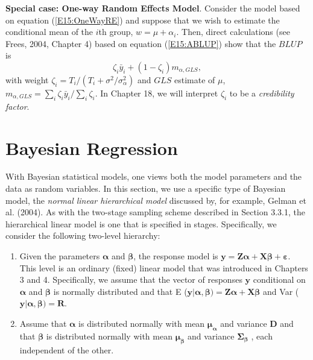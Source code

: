 \textbf{Special case: One-way Random Effects Model}. Consider the
model based on equation (\ref{E15:OneWayRE}) and suppose that we
wish to estimate the conditional mean of the $i$th group, $w=\mu +
\alpha_i.$ Then, direct calculations (see Frees, 2004, Chapter 4)
based on equation (\ref{E15:ABLUP}) show that the $BLUP$ is
\begin{equation}\label{E15:OneWayBLUP}
\zeta_i \bar{y}_i + (1-\zeta_i ) m_{\alpha,GLS} ,
\end{equation}
with weight $\zeta_i = T_i /(T_i + \sigma^2/\sigma^2_{\alpha}) $ and
$GLS$ estimate of $\mu$, $ m_{\alpha,GLS}  = \sum_i \zeta_i
\bar{y}_i / \sum_i \zeta_i$. In Chapter 18, we will interpret
$\zeta_i$ to be a \emph{credibility factor}.


\linejed

\section{Bayesian Regression}

With Bayesian statistical models, one views both the model
parameters and the data as random variables. In this section, we use
a specific type of Bayesian model, the \emph{normal linear
hierarchical model} discussed by, for example, Gelman et al. (2004).
As with the two-stage sampling scheme described in Section 3.3.1,
the hierarchical linear model is one that is specified in stages.
Specifically, we consider the following two-level hierarchy:

\begin{enumerate}
\item Given the parameters $\boldsymbol \alpha$ and $\boldsymbol \beta$, the response model is
$\mathbf{y} = \mathbf{Z}\boldsymbol \alpha + \mathbf{X}\boldsymbol
\beta  + \boldsymbol \varepsilon $. This level is an ordinary
(fixed) linear model that was introduced in Chapters 3 and 4.
Specifically, we assume that the vector of responses $\mathbf{y}$
conditional on $\boldsymbol \alpha$ and $\boldsymbol \beta$ is
normally distributed and that E ($\mathbf{y} | \boldsymbol \alpha,
\boldsymbol \beta ) = \mathbf{Z}\boldsymbol \alpha +
\mathbf{X}\boldsymbol \beta$ and Var ($\mathbf{y} | \boldsymbol
\alpha, \boldsymbol \beta)  = \mathbf{R}$.

\item Assume that $\boldsymbol \alpha$ is distributed normally with mean $\boldsymbol{\mu _{\alpha}}$ and variance
$\mathbf{D}$ and that $\boldsymbol \beta$ is distributed normally
with mean $\boldsymbol{\mu _{\beta}}$   and variance
$\boldsymbol{\Sigma _{\beta}}$ , each independent of the other.

\end{enumerate}

